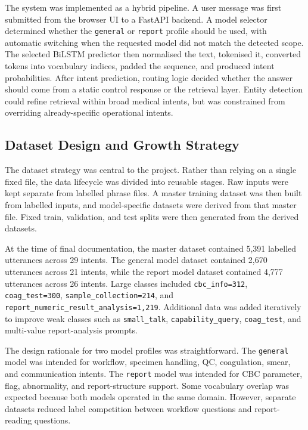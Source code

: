 The system was implemented as a hybrid pipeline. A user message was first submitted from the browser UI to a FastAPI backend. A model selector determined whether the \texttt{general} or \texttt{report} profile should be used, with automatic switching when the requested model did not match the detected scope. The selected BiLSTM predictor then normalised the text, tokenised it, converted tokens into vocabulary indices, padded the sequence, and produced intent probabilities. After intent prediction, routing logic decided whether the answer should come from a static control response or the retrieval layer. Entity detection could refine retrieval within broad medical intents, but was constrained from overriding already-specific operational intents.

\subsection{Dataset Design and Growth Strategy}

The dataset strategy was central to the project. Rather than relying on a single fixed file, the data lifecycle was divided into reusable stages. Raw inputs were kept separate from labelled phrase files. A master training dataset was then built from labelled inputs, and model-specific datasets were derived from that master file. Fixed train, validation, and test splits were then generated from the derived datasets.

At the time of final documentation, the master dataset contained 5,391 labelled utterances across 29 intents. The general model dataset contained 2,670 utterances across 21 intents, while the report model dataset contained 4,777 utterances across 26 intents. Large classes included \texttt{cbc\_info=312}, \texttt{coag\_test=300}, \texttt{sample\_collection=214}, and \texttt{report\_numeric\_result\_analysis=1,219}. Additional data was added iteratively to improve weak classes such as \texttt{small\_talk}, \texttt{capability\_query}, \texttt{coag\_test}, and multi-value report-analysis prompts.

The design rationale for two model profiles was straightforward. The \texttt{general} model was intended for workflow, specimen handling, QC, coagulation, smear, and communication intents. The \texttt{report} model was intended for CBC parameter, flag, abnormality, and report-structure support. Some vocabulary overlap was expected because both models operated in the same domain. However, separate datasets reduced label competition between workflow questions and report-reading questions.

